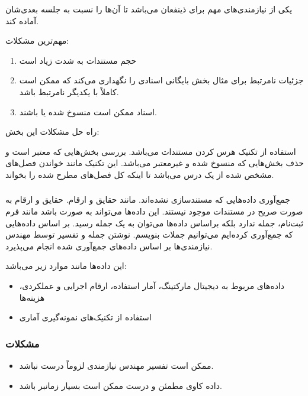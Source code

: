 یکی از نیازمندی‌های مهم برای ذینفعان می‌باشد تا آن‌ها را نسبت به جلسه بعدی‌شان
آماده کند.

مهم‌ترین مشکلات:

\begin{enumerate}
    \item حجم مستندات به شدت زیاد است
    \item جزئیات نامرتبط برای مثال بخش بایگانی اسنادی را نگهداری می‌کند که ممکن
    است کاملاً با یکدیگر نامرتبط باشد.
    \item اسناد ممکن است منسوخ شده یا  باشند.
\end{enumerate}

راه حل مشکلات این بخش:

استفاده از تکنیک هرس کردن مستندات می‌باشد. بررسی بخش‌هایی که معتبر است و حذف
بخش‌هایی که منسوخ شده و غیرمعتبر می‌باشد. این تکنیک مانند خواندن فصل‌های مشخص
شده از یک درس می‌باشد تا اینکه کل فصل‌های مطرح شده را بخواند.

\subsubsection{}

جمع‌آوری داده‌هایی که مستندسازی نشده‌اند. مانند حقایق و ارقام. حقایق و ارقام به
صورت صریح در مستندات موجود نیستند. این داده‌ها می‌تواند به صورت 
باشد مانند فرم ثبت‌نام، جمله ندارد بلکه براساس داده‌ها می‌توان به یک جمله رسید.
بر اساس داده‌هایی که جمع‌آوری کرده‌ایم می‌توانیم جملات  بنویسم.
نوشتن جمله و تفسیر توسط مهندس نیازمندی‌ها بر اساس داده‌های جمع‌آوری شده انجام
می‌پذیرد.

این داده‌ها مانند موارد زیر می‌باشد:

\begin{itemize}
    \item داده‌های مربوط به دیجیتال مارکتینگ، آمار استفاده، ارقام اجرایی و
    عملکردی، هزینه‌ها
    \item استفاده از تکنیک‌های نمونه‌گیری آماری
\end{itemize}

\subsubsection*{مشکلات}

\begin{itemize}
    \item ممکن است تفسیر مهندس نیازمندی لزوماً درست نباشد.
    \item داده کاوی مطمئن و درست ممکن است بسیار زمانبر باشد.
\end{itemize}

